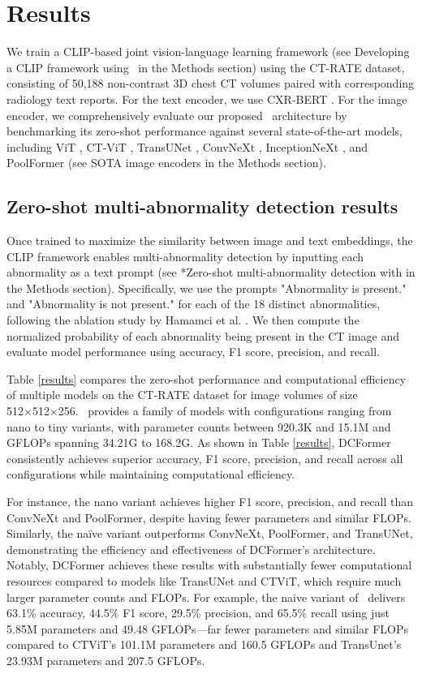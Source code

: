 \section*{Results}
We train a CLIP-based joint vision-language learning framework (see Developing a CLIP framework using \dc\ in the Methods section) using the CT-RATE dataset, consisting of 50,188 non-contrast 3D chest CT volumes paired with corresponding radiology text reports. For the text encoder, we use CXR-BERT \cite{boecking2022making}. For the image encoder, we comprehensively evaluate our proposed \dc\ architecture by benchmarking its zero-shot performance against several state-of-the-art models, including ViT \cite{dosovitskiy2020image}, CT-ViT \cite{hamamci2025generatect, hamamci2024foundation}, TransUNet \cite{chen2021transunet}, ConvNeXt \cite{liu2022convnet}, InceptionNeXt \cite{yu2024inceptionnext}, and PoolFormer \cite{yu2022metaformer} (see SOTA image encoders in the Methods section).



\subsection*{Zero-shot multi-abnormality detection results}
Once trained to maximize the similarity between image and text embeddings, the CLIP framework enables multi-abnormality detection by inputting each abnormality as a text prompt (see *Zero-shot multi-abnormality detection with \dc* in the Methods section). Specifically, we use the prompts "{Abnormality} is present." and "{Abnormality} is not present." for each of the 18 distinct abnormalities, following the ablation study by Hamamci et al. \cite{hamamci2024foundation}. We then compute the normalized probability of each abnormality being present in the CT image and evaluate model performance using accuracy, F1 score, precision, and recall.

Table \ref{results} compares the zero-shot performance and computational efficiency of multiple models on the CT-RATE dataset for image volumes of size 512×512×256. \dc\ provides a family of models with configurations ranging from nano to tiny variants, with parameter counts between 920.3K and 15.1M and GFLOPs spanning 34.21G to 168.2G. As shown in Table \ref{results}, DCFormer consistently achieves superior accuracy, F1 score, precision, and recall across all configurations while maintaining computational efficiency.

For instance, the nano variant achieves higher F1 score, precision, and recall than ConvNeXt and PoolFormer, despite having fewer parameters and similar FLOPs. Similarly, the naïve variant outperforms ConvNeXt, PoolFormer, and TransUNet, demonstrating the efficiency and effectiveness of DCFormer's architecture. Notably, DCFormer achieves these results with substantially fewer computational resources compared to models like TransUNet and CTViT, which require much larger parameter counts and FLOPs. For example, the naive variant of \dc\ delivers 63.1\% accuracy, 44.5\% F1 score, 29.5\% precision, and 65.5\% recall using just 5.85M parameters and 49.48 GFLOPs—far fewer parameters and similar FLOPs compared to CTViT’s 101.1M parameters and 160.5 GFLOPs and TransUnet's 23.93M parameters and 207.5 GFLOPs.

